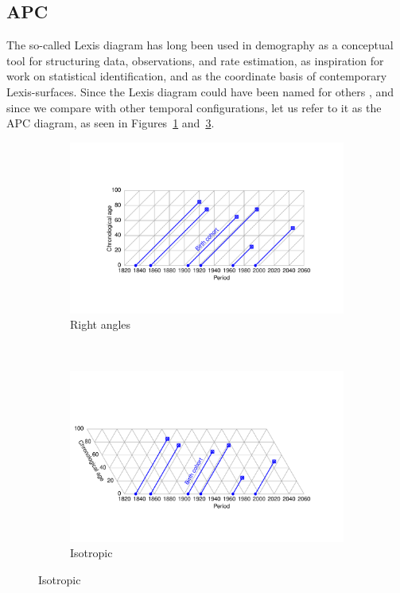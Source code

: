 \documentclass[11pt,oneside,a4paper]{article} %
\newcommand\tgh[1]{\raisebox{-.25\height}{\texttt{[image: Figures/triadtable/triad\#1.pdf]}}}
\begin{document}
\FloatBarrier
\subsection*{APC}%
\FloatBarrier
The so-called Lexis diagram has long been used in demography as a conceptual
tool for structuring data, observations, and rate estimation, as inspiration for work
on statistical identification, and as the coordinate basis of contemporary
Lexis-surfaces.
Since the Lexis diagram could have been named for others
\citep{vandeschrick2001lexis,keiding2011age}, and since we compare with other
temporal configurations, let us refer to it as the APC diagram, as seen in
Figures~\ref{fig:APCrt} and~\ref{fig:APCeq}. 

\begin{figure} 
\caption{An APC diagram in two projections.}
\label{fig:APC}
\centering
\begin{subfigure}{1.1\textwidth}
\caption{Right angles}
\vspace{-6em}
\label{fig:APCrt}
\includegraphics[scale=0.6]{Figures/APCrt.pdf}
\end{subfigure}
\\\vspace{-2em}
\begin{subfigure}{1.1\textwidth}
\caption{Isotropic}
\vspace{-6em}
\label{fig:APCeq}
\includegraphics[scale=0.6]{Figures/APCeq.pdf}
\end{subfigure}
\end{figure}
\end{document}
